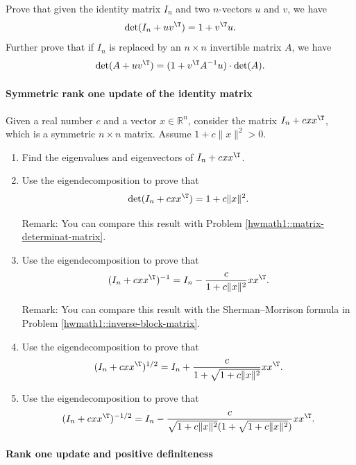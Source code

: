 Prove that  given the identity matrix $I_n$ and two $n$-vectors $u$ and $v$, we have
$$
\text{det}(I_n + uv^{\T}) = 1 + v^{\T} u. 
$$
Further prove that if $I_n$ is replaced by an $n\times n$ invertible matrix $A$, we have
$$
\text{det}(A + uv^{\T}) = (1 +  v^{\T} A^{-1} u)  \cdot  \text{det}(A). 
$$




\paragraph{Symmetric rank one update of the identity matrix}\label{hwmath1::symmetric-rank-one-update}



Given a real number $c$ and a vector $x\in \mathbb{R}^n$, consider the matrix $ I_n + c xx^{\T}$, which is a symmetric $n\times n$ matrix. Assume $1 + c \| x\|^2  > 0$. 


\begin{enumerate}
\item
Find the eigenvalues and eigenvectors of $I_n + c xx^{\T}$.
\item
Use the eigendecomposition to prove that 
$$
\text{det}( I_n + c xx^{\T} ) 
= 1 + c \| x\|^2.
$$

Remark: You can compare this result with Problem \ref{hwmath1::matrix-determinat-matrix}. 

\item
Use the eigendecomposition to prove that
$$
(I_n + c xx^{\T})^{-1} 
=  I_n  - \frac{ c }{ 1 + c \| x\|^2  } xx^{\T}.
$$

Remark: You can compare this result with the Sherman--Morrison formula in Problem \ref{hwmath1::inverse-block-matrix}.


\item
Use the eigendecomposition to prove that
$$
(I_n + c xx^{\T})^{1/2} 
=  I_n  + \frac{ c  }{  1+ \sqrt{ 1 + c\| x\|^2}  } xx^{\T}.
$$

\item
Use the eigendecomposition to prove that
$$
(I_n + c xx^{\T})^{ - 1/2} 
=  I_n  - \frac{ c }{ \sqrt{1 + c \| x\|^2} (1+\sqrt{1 + c \| x\|^2})  } xx^{\T}. 
$$

\end{enumerate}




\paragraph{Rank one update and positive definiteness}\label{hwmath::rank1psd}


